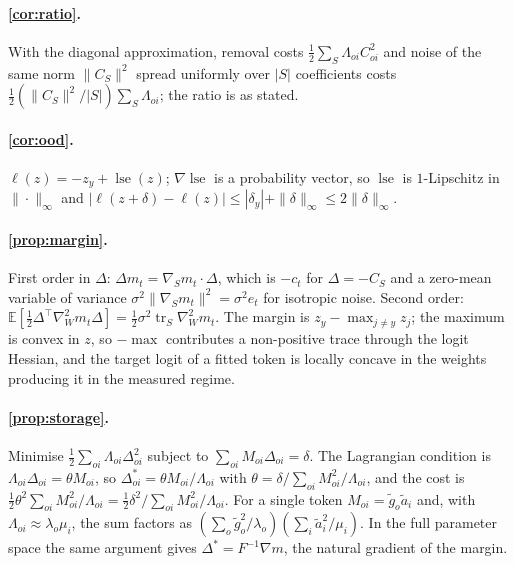 \documentclass{article}
\theoremstyle{definition}\newtheorem{law}{Empirical law}
\newcommand{\E}{\mathbb{E}}
\DeclareMathOperator{\tr}{tr}
\begin{document}
\paragraph{\cref{cor:ratio}.} With the diagonal approximation, removal costs $\tfrac12\sum_S\Lambda_{oi}C_{oi}^2$ and noise of the same norm $\|C_S\|^2$ spread uniformly over $|S|$ coefficients costs $\tfrac12(\|C_S\|^2/|S|)\sum_S\Lambda_{oi}$; the ratio is as stated.

\paragraph{\cref{cor:ood}.} $\ell(z)=-z_y+\operatorname{lse}(z)$; $\nabla\operatorname{lse}$ is a probability vector, so $\operatorname{lse}$ is $1$-Lipschitz in $\|\cdot\|_\infty$ and $|\ell(z+\delta)-\ell(z)|\le|\delta_y|+\|\delta\|_\infty\le2\|\delta\|_\infty$.

\paragraph{\cref{prop:margin}.} First order in $\Delta$: $\Delta m_t=\nabla_Sm_t\cdot\Delta$, which is $-c_t$ for $\Delta=-C_S$ and a zero-mean variable of variance $\sigma^2\|\nabla_Sm_t\|^2=\sigma^2e_t$ for isotropic noise. Second order: $\E[\tfrac12\Delta^\top\nabla^2_Wm_t\Delta]=\tfrac12\sigma^2\tr_S\nabla^2_Wm_t$. The margin is $z_y-\max_{j\ne y}z_j$; the maximum is convex in $z$, so $-\max$ contributes a non-positive trace through the logit Hessian, and the target logit of a fitted token is locally concave in the weights producing it in the measured regime.

\paragraph{\cref{prop:storage}.} Minimise $\tfrac12\sum_{oi}\Lambda_{oi}\Delta_{oi}^2$ subject to $\sum_{oi}M_{oi}\Delta_{oi}=\delta$. The Lagrangian condition is $\Lambda_{oi}\Delta_{oi}=\theta M_{oi}$, so $\Delta^*_{oi}=\theta M_{oi}/\Lambda_{oi}$ with $\theta=\delta/\sum_{oi}M_{oi}^2/\Lambda_{oi}$, and the cost is $\tfrac12\theta^2\sum_{oi}M_{oi}^2/\Lambda_{oi}=\tfrac12\delta^2/\sum_{oi}M_{oi}^2/\Lambda_{oi}$. For a single token $M_{oi}=\tilde g_o\tilde a_i$ and, with $\Lambda_{oi}\approx\lambda_o\mu_i$, the sum factors as $(\sum_o\tilde g_o^2/\lambda_o)(\sum_i\tilde a_i^2/\mu_i)$. In the full parameter space the same argument gives $\Delta^*=F^{-1}\nabla m$, the natural gradient of the margin.
\end{document}
